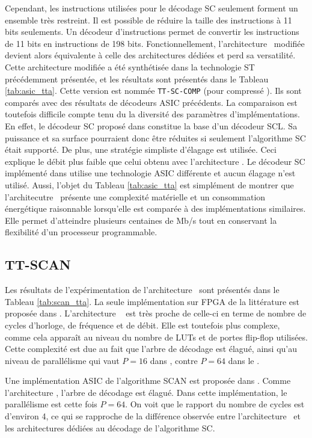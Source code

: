 Cependant, les instructions utilisées pour le décodage SC seulement forment un ensemble très restreint. Il est possible de réduire la taille des instructions à 11 bits seulements. Un décodeur d'instructions permet de convertir les instructions de 11 bits en instructions de 198 bits. Fonctionnellement, l'architecture \TTSC~modifiée devient alors équivalente à celle des architectures dédiées et perd sa versatilité. Cette architecture modifiée a été synthétisée dans la technologie ST précédemment présentée, et les résultats sont présentés dans le Tableau \ref{tab:asic_tta}. Cette version est nommée \texttt{TT-SC-COMP} (pour \og compressé \fg). Ils sont comparés avec des résultats de décodeurs ASIC précédents. La comparaison est toutefois difficile compte tenu du la diversité des paramètres d'implémentations. En effet, le décodeur SC proposé dans \cite{giard_polarbear:_2017} constitue la base d'un décodeur SCL. Sa puissance et sa surface pourraient donc être réduites si seulement l'algorithme SC était supporté. De plus, une stratégie simpliste d'élagage est utilisée. Ceci explique le débit plus faible que celui obtenu avec l'architecture \TTSC. Le décodeur SC implémenté dans \cite{mishra_successive_2012} utilise une technologie ASIC différente et aucun élagage n'est utilisé. Aussi, l'objet du Tableau \ref{tab:asic_tta} est simplément de montrer que l'architecutre \TTSC~présente une complexité matérielle et un consommation énergétique raisonnable lorsqu'elle est comparée à des implémentations similaires. Elle permet d'atteindre plusieurs centaines de Mb/s tout en conservant la flexibilité d'un processeur programmable.


\subsection{TT-SCAN}

Les résultats de l'expérimentation de l'architecture \TTSCAN~sont présentés dans le Tableau \ref{tab:scan_tta}. La seule implémentation sur FPGA de la littérature est proposée dans \cite{berhault_hardware_2015}. L'architecture \TTSCAN~ est très proche de celle-ci en terme de nombre de cycles d'horloge, de fréquence et de débit. Elle est toutefois plus complexe, comme cela apparaît au niveau du nombre de LUTs et de portes flip-flop utilisées. Cette complexité est due au fait que l'arbre de décodage est élagué, ainsi qu'au niveau de parallélisme qui vaut $P=16$ dans \cite{berhault_hardware_2015}, contre $P=64$ dans le \TTSCAN.

Une implémentation ASIC de l'algorithme SCAN est proposée dans \cite{lin_reduced_2015}. Comme l'architecture \TTSCAN, l'arbre de décodage est élagué. Dans cette implémentation, le parallélisme est cette fois $P=64$. On voit que le rapport du nombre de cycles est d'environ 4, ce qui se rapproche de la différence observée entre l'architecture \TTSC~et les architectures dédiées au décodage de l'algorithme SC.

